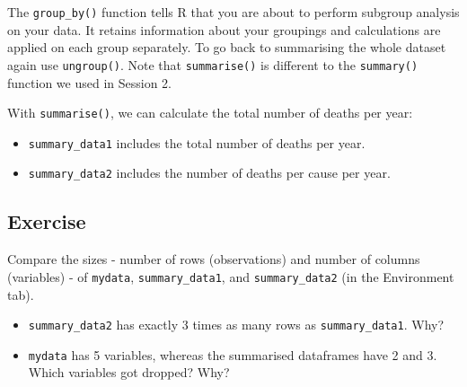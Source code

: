 \documentclass[]{book}
\makeatletter
\newenvironment{Shaded}{\begin{snugshade}}{\end{snugshade}}
\newcommand{\KeywordTok}[1]{\textcolor[rgb]{0.13,0.29,0.53}{\textbf{#1}}}
\newcommand{\DataTypeTok}[1]{\textcolor[rgb]{0.13,0.29,0.53}{#1}}
\newcommand{\StringTok}[1]{\textcolor[rgb]{0.31,0.60,0.02}{#1}}
\newcommand{\OperatorTok}[1]{\textcolor[rgb]{0.81,0.36,0.00}{\textbf{#1}}}
\newcommand{\NormalTok}[1]{#1}
\providecommand{\tightlist}{%
  \setlength{\itemsep}{0pt}\setlength{\parskip}{0pt}}
\newenvironment{kframe}{%
\medskip{}
\setlength{\fboxsep}{.8em}
 \def\at@end@of@kframe{}%
 \ifinner\ifhmode%
  \def\at@end@of@kframe{\end{minipage}}%
  \begin{minipage}{\columnwidth}%
 \fi\fi%
 \def\FrameCommand##1{\hskip\@totalleftmargin \hskip-\fboxsep
 \colorbox{shadecolor}{##1}\hskip-\fboxsep
     \hskip-\linewidth \hskip-\@totalleftmargin \hskip\columnwidth}%
 \MakeFramed {\advance\hsize-\width
   \@totalleftmargin\z@ \linewidth\hsize
   \@setminipage}}%
 {\par\unskip\endMakeFramed%
 \at@end@of@kframe}
\renewenvironment{Shaded}{\begin{kframe}}{\end{kframe}}
\makeatother
\begin{document}
The \texttt{group\_by()} function tells R that you are about to perform
subgroup analysis on your data. It retains information about your
groupings and calculations are applied on each group separately. To go
back to summarising the whole dataset again use \texttt{ungroup()}. Note
that \texttt{summarise()} is different to the \texttt{summary()}
function we used in Session 2.

With \texttt{summarise()}, we can calculate the total number of deaths
per year:

\begin{Shaded}
\end{Shaded}

\begin{itemize}
\tightlist
\item
  \texttt{summary\_data1} includes the total number of deaths per year.
\item
  \texttt{summary\_data2} includes the number of deaths per cause per
  year.
\end{itemize}

\subsection{Exercise}\label{exercise-16}

Compare the sizes - number of rows (observations) and number of columns
(variables) - of \texttt{mydata}, \texttt{summary\_data1}, and
\texttt{summary\_data2} (in the Environment tab).

\begin{itemize}
\tightlist
\item
  \texttt{summary\_data2} has exactly 3 times as many rows as
  \texttt{summary\_data1}. Why?
\item
  \texttt{mydata} has 5 variables, whereas the summarised dataframes
  have 2 and 3. Which variables got dropped? Why?
\end{itemize}
\end{document}
